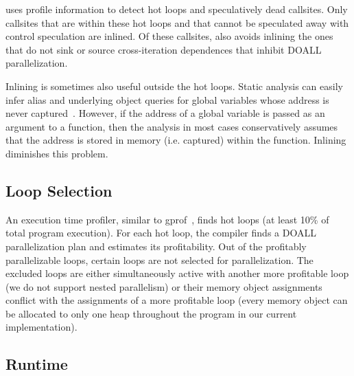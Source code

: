 \name uses profile information to detect hot loops and speculatively
dead callsites.  Only callsites that are within these hot loops and
that cannot be speculated away with control speculation are inlined.
%
Of these callsites, \name also avoids inlining the ones that do not
sink or source cross-iteration dependences that inhibit DOALL
parallelization.
%

Inlining is sometimes also useful outside the hot loops.
%
Static analysis can easily infer alias and underlying object queries
for global variables whose address is never
captured~\cite{johnson:17:cgo}.  However, if the address of a global
variable is passed as an argument to a function, then the analysis in
most cases conservatively assumes that the address is stored in memory
(i.e. captured)  within the function. Inlining diminishes this
problem.


\subsection{Loop Selection} An execution time profiler, similar to
gprof~\cite{Privateer26}, finds hot loops (at least 10\% of total
program execution).
%
For each hot loop, the compiler finds a DOALL parallelization plan and
estimates its profitability.
%
Out of the profitably parallelizable loops, certain loops are not
selected for parallelization. The excluded loops are either
simultaneously active with another more profitable loop (we do not
support nested parallelism) or their memory object assignments
conflict with the assignments of a more profitable loop (every memory
object can be allocated to only one heap throughout the program in our
current implementation).

\subsection{Runtime}



